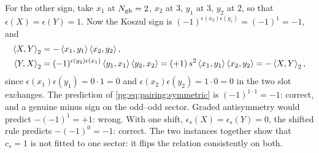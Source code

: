 For the other sign, take $x_1$ at $N_{\rm gh}=2$, $x_2$ at $3$, $y_1$ at $3$, $y_2$ at $2$, so that $\epsilon(X)=\epsilon(Y)=1$.
Now the Koszul sign is $(-1)^{\epsilon(x_2)\epsilon(y_1)}=(-1)^{1}=-1$, and
\begin{align}
  \braket{X, Y}_2
    &
    = - \braket{x_1, y_1} \braket{x_2, y_2},
  \\
  \braket{Y, X}_2
    &
    = (-1)^{\epsilon(y_2)\epsilon(x_1)} \braket{y_1, x_1} \braket{y_2, x_2}
    = (+1) \, s^2 \braket{x_1, y_1} \braket{x_2, y_2}
    = - \braket{X, Y}_2,
\end{align}
since $\epsilon(x_1)\epsilon(y_1)=0\cdot1=0$ and $\epsilon(x_2)\epsilon(y_2)=1\cdot0=0$ in the two slot exchanges.
The prediction of \eqref{pg:eq:pairing:symmetric} is $(-1)^{1\cdot1}=-1$: correct, and a genuine minus sign on the odd--odd sector.
Graded antisymmetry would predict $-(-1)^{1}=+1$: wrong.
With one shift, $\epsilon_s(X)=\epsilon_s(Y)=0$, the shifted rule predicts $-(-1)^{0}=-1$: correct.
The two instances together show that $c_s=1$ is not fitted to one sector: it flips the relation consistently on both.

